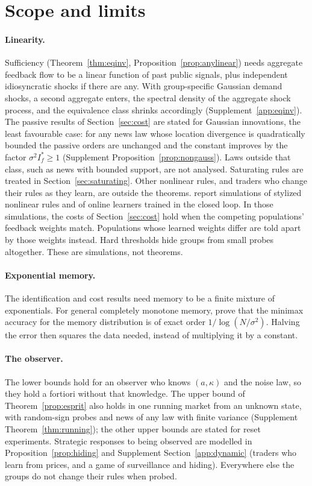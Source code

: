 \documentclass[12pt]{article}
\theoremstyle{definition}
\theoremstyle{remark}
\begin{document}
\section{Scope and limits}\label{sec:scope}

\paragraph{Linearity.} Sufficiency (Theorem~\ref{thm:eqinv}, Proposition~\ref{prop:anylinear}) needs aggregate feedback flow to be a linear function of past public signals, plus independent idiosyncratic shocks if there are any. With group-specific Gaussian demand shocks, a second aggregate enters, the spectral density of the aggregate shock process, and the equivalence class shrinks accordingly (Supplement~\ref{app:eqinv}). The passive results of Section~\ref{sec:cost} are stated for Gaussian innovations, the least favourable case: for any news law whose location divergence is quadratically bounded the passive orders are unchanged and the constant improves by the factor $\sigma^2I^*_f\ge1$ (Supplement Proposition~\ref{prop:nongauss}). Laws outside that class, such as news with bounded support, are not analysed. Saturating rules are treated in Section~\ref{sec:saturating}. Other nonlinear rules, and traders who change their rules as they learn, are outside the theorems. \citet{niroula2026a} report simulations of stylized nonlinear rules and of online learners trained in the closed loop. In those simulations, the costs of Section~\ref{sec:cost} hold when the competing populations' feedback weights match. Populations whose learned weights differ are told apart by those weights instead. Hard thresholds hide groups from small probes altogether. These are simulations, not theorems.

\paragraph{Exponential memory.} The identification and cost results need memory to be a finite mixture of exponentials. For general completely monotone memory, \citet{niroula2026a} prove that the minimax accuracy for the memory distribution is of exact order $1/\log(N/\sigma^2)$. Halving the error then squares the data needed, instead of multiplying it by a constant.

\paragraph{The observer.} The lower bounds hold for an observer who knows $(a,\kappa)$ and the noise law, so they hold a fortiori without that knowledge. The upper bound of Theorem~\ref{prop:esprit} also holds in one running market from an unknown state, with random-sign probes and news of any law with finite variance (Supplement Theorem~\ref{thm:running}); the other upper bounds are stated for reset experiments. Strategic responses to being observed are modelled in Proposition~\ref{prop:hiding} and Supplement Section~\ref{app:dynamic} (traders who learn from prices, and a game of surveillance and hiding). Everywhere else the groups do not change their rules when probed.
\end{document}
